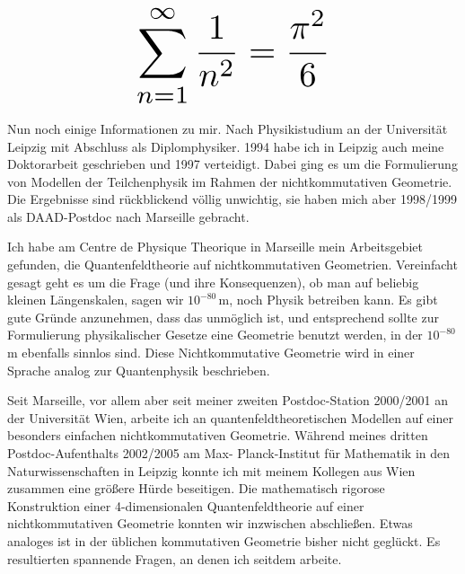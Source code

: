 \begin{multicols}{2}
\[
\resizebox{0.45\hsize}{!}{$\displaystyle\sum_{n = 1}^\infty \frac{1}{n^2} = \frac{\pi^2}{6}$}
\]

Nun noch einige Informationen zu mir. Nach Physikistudium an der Universität Leipzig mit Abschluss als Diplomphysiker. 1994 habe ich in Leipzig auch meine Doktorarbeit geschrieben und 1997 verteidigt. Dabei ging es um die Formulierung von Modellen der Teilchenphysik im Rahmen der nichtkommutativen Geometrie. Die Ergebnisse sind rückblickend völlig unwichtig, sie haben mich aber 1998/1999 als DAAD-Postdoc nach Marseille gebracht.

Ich habe am Centre de Physique Theorique in Marseille mein Arbeitsgebiet gefunden, die Quantenfeldtheorie auf nichtkommutativen Geometrien. Vereinfacht gesagt geht es um die Frage (und ihre Konsequenzen), ob man auf beliebig kleinen Längenskalen, sagen wir $10^{-80}$\,m, noch Physik betreiben kann. Es gibt gute Gründe anzunehmen, dass das unmöglich ist, und entsprechend sollte zur Formulierung physikalischer Gesetze eine Geometrie benutzt werden, in der $10^{-80}$\,m ebenfalls sinnlos sind. Diese Nichtkommutative Geometrie wird in einer Sprache analog zur Quantenphysik beschrieben.

Seit Marseille, vor allem aber seit meiner zweiten Postdoc-Station 2000/2001 an der Universität Wien, arbeite ich an quantenfeldtheoretischen Modellen auf einer besonders einfachen nichtkommutativen Geometrie. Während meines dritten Postdoc-Aufenthalts 2002/2005 am Max- Planck-Institut für Mathematik in den Naturwissenschaften in Leipzig konnte ich mit meinem Kollegen aus Wien zusammen eine größere Hürde beseitigen. Die mathematisch rigorose Konstruktion einer 4-dimensionalen Quantenfeldtheorie auf einer nichtkommutativen Geometrie konnten wir inzwischen abschließen. Etwas analoges ist in der üblichen kommutativen Geometrie bisher nicht geglückt. Es resultierten spannende Fragen, an denen ich seitdem arbeite.
\end{multicols}

\vspace*{\fill}

\begin{center}
\end{center}

\vfill
